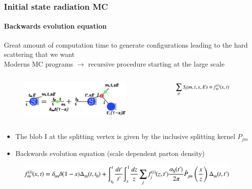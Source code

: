 \documentclass[aspectratio=43]{beamer}
\begin{document}
\begin{frame}

	\frametitle{Initial state radiation MC}
	\framesubtitle{Backwards evolution equation}

	\footnotesize Great amount of computation time to generate configurations leading to the hard scattering that we want \\
	\footnotesize Moderns MC programs $\rightarrow$ recursive procedure starting at the large scale \\
	
	\begin{columns}
		
		
		\begin{figure}
			\includegraphics[width = 6 cm]{plots/ISR_backwards.png}
		\end{figure}
		
		
		\begin{figure}
			\includegraphics[width = 3.5 cm]{plots/ISR_backwards_eq1.png}
		\end{figure}
		
	\end{columns}
	
	\vspace{0.5cm}
	
	\begin{itemize}
		\item \footnotesize The blob I at the splitting vertex is given by the inclusive splitting kernel $P_{jm}$ \\
		\item \footnotesize Backwards evolution equation (scale dependent parton density)
	\end{itemize}

	\begin{figure}
		\includegraphics[width = 10 cm]{plots/ISR_backwards_eq2.png}
	\end{figure}

\end{frame}
\end{document}
